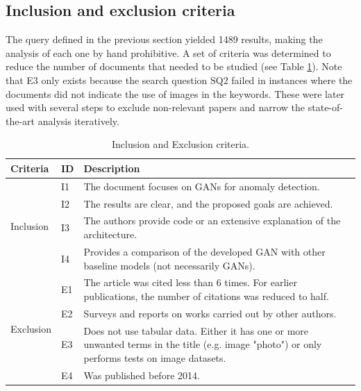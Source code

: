 \subsection{Inclusion and exclusion criteria}\label{sec:gan_inclusion_exclusion}
The query defined in the previous section yielded 1489 results, making the analysis of each one by hand prohibitive. A set of criteria was determined to reduce the number of documents that needed to be studied (see Table \ref{tab:criteria}). Note that E3 only exists because the search question SQ2 failed in instances where the documents did not indicate the use of images in the keywords. These were later used with several steps to exclude non-relevant papers and narrow the state-of-the-art analysis iteratively. 

\begin{table}[ht]
\caption{Inclusion and Exclusion criteria.}
\label{tab:criteria}
\begin{tabularx}{\textwidth}{@{}llX@{}}
\hline
\textbf{Criteria}                                       & \textbf{ID} & \textbf{Description}                                                                                                                                     \\ \midrule
\multirow{4}{*}{Inclusion}                     & I1 & The document focuses on GANs for anomaly detection.                                                                                             \\
                                               & I2 & The results are clear, and the proposed goals are achieved.                                                                                     \\
                                               & I3 & The authors provide code or an extensive explanation of the architecture.                                                                       \\
                                               & I4 & Provides a comparison of the developed GAN with other baseline models (not necessarily GANs).                                                   \\ \midrule
\multicolumn{1}{c}{\multirow{4}{*}{Exclusion}} & E1 & The article was cited less than 6 times. For earlier publications, the number of citations was reduced to half.                                 \\
\multicolumn{1}{c}{}                           & E2 & Surveys and reports on works carried out by other authors.                                                                                      \\
\multicolumn{1}{c}{}                           & E3 & Does not use tabular data. Either it has one or more unwanted terms in the title (e.g. image "photo") or only performs tests on image datasets. \\
\multicolumn{1}{c}{}                           & E4 & Was published before 2014. \\\hline                                                                                                                    
\end{tabularx}
\end{table}


